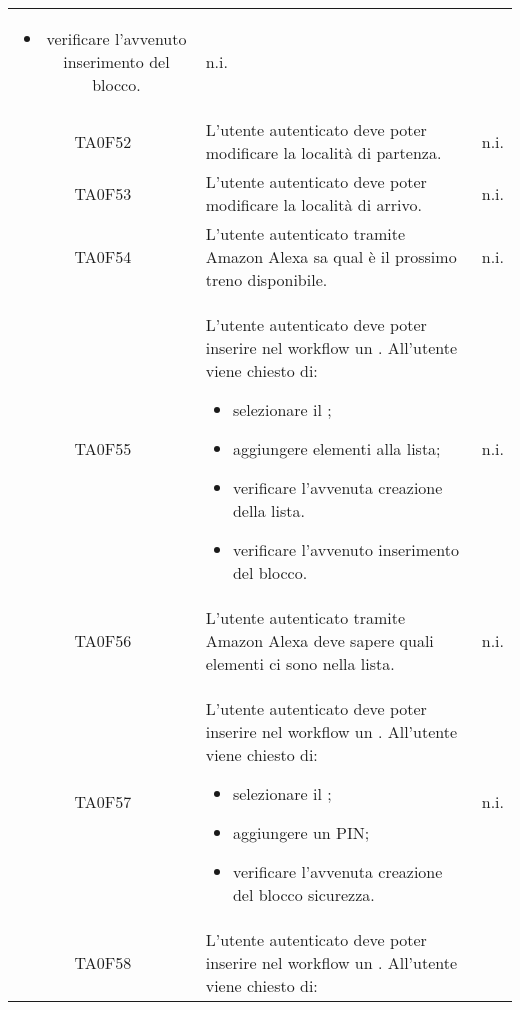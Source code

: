 \begin{center}
\begin{longtable}{ c m{12cm} c }
\begin{itemize}
		\item verificare l'avvenuto inserimento del blocco.										
	\end{itemize} 																																								& n.i. \\
	TA0F52   & L'utente autenticato deve poter modificare la località di partenza.                                                       										& n.i. \\
	TA0F53   & L'utente autenticato deve poter modificare la località di arrivo.                                                        										& n.i. \\
	TA0F54   & L'utente autenticato tramite Amazon Alexa sa qual è il prossimo treno disponibile.                                            										& n.i. \\
	TA0F55   & L'utente autenticato deve poter inserire nel workflow un \BLista. All'utente viene chiesto di: 										
	\begin{itemize}										
		\item selezionare il \BLista;										
		\item aggiungere elementi alla lista;										
		\item verificare l'avvenuta creazione della lista.										
		\item verificare l'avvenuto inserimento del blocco.										
	\end{itemize}   																																						                                         										& n.i. \\
	TA0F56   & L'utente autenticato tramite Amazon Alexa deve sapere quali elementi ci sono nella lista.                                 										& n.i. \\
	TA0F57   & L'utente autenticato deve poter inserire nel workflow un \BSicurezza. All'utente viene chiesto di: 										
	\begin{itemize}										
		\item selezionare il \BSicurezza;										
		\item aggiungere un PIN;										
		\item verificare l'avvenuta creazione del blocco sicurezza.						
	\end{itemize}   																																							& n.i. \\
	TA0F58 & L'utente autenticato deve poter inserire nel workflow un \BKindle. All'utente viene chiesto di:

\end{longtable}
\end{center}
